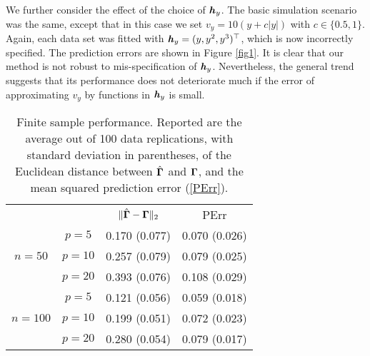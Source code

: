 \documentclass[12pt]{article}
\def \bfith{\mbox{\textbf{\textit{h}}}}
\def \bfGamma{\mbox{\boldmath $\Gamma$}}
\begin{document}
We further consider the effect of the choice of $\bfith_y$. The basic simulation scenario was the same, except that in this case we set $v_y = 10(y + c |y|)$ with $c \in \{0.5, 1\}$. Again, each data set was fitted with $\bfith_y = (y, y^2, y^3)^{\top}$, which is now incorrectly specified. The prediction errors are shown in Figure \ref{fig1}. It is clear that our method is not robust to mis-specification of $\bfith_y$. Nevertheless, the general trend suggests that its performance does not deteriorate much if the error of approximating $v_y$ by functions in $\bfith_y$ is small.

\begin{table}[htb!]\caption{Finite sample performance. Reported are the average out of 100 data replications, with standard deviation in parentheses, of the Euclidean distance between $\hat{\bfGamma}$ and $\bfGamma$, and the mean squared prediction error (\ref{PErr}).} \label{tab1} \vspace{-0.3cm}
\centering
 {\small\scriptsize\hspace{12.5cm}
\renewcommand{\arraystretch}{1.2} %
\begin{tabular}{cccc}
\hline
             &           & $\|\hat{\bfGamma} - \bfGamma\|_2$            & PErr           \\
             & $p = 5$   & 0.170 (0.077)   & 0.070  (0.026) \\
   $n = 50$  & $p = 10$  & 0.257 (0.079)   & 0.079  (0.025) \\
             & $p = 20$  & 0.393 (0.076)   & 0.108  (0.029) \\
             & $p = 5$   & 0.121 (0.056)   & 0.059  (0.018) \\
   $n = 100$ & $p = 10$  & 0.199 (0.051)   & 0.072  (0.023) \\
             & $p = 20$  & 0.280 (0.054)   & 0.079  (0.017) \\
\hline
\end{tabular} }%
\end{table}
\end{document}
